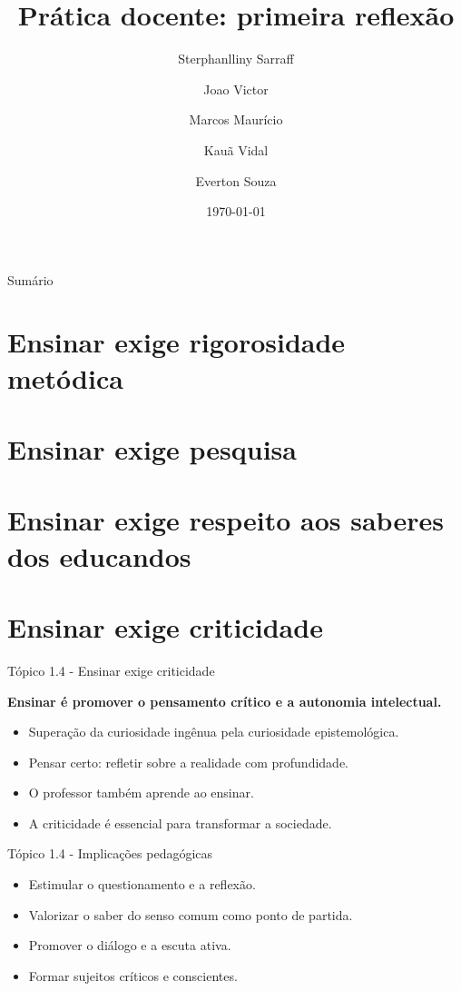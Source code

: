 \documentclass[12pt]{beamer}
\author[Sarraff \and Joao Victor \and ...]{%
Sterphanlliny Sarraff\inst{1} \and Joao Victor\inst{2} \and Marcos Maurício\inst{2} \\ \and Kauã Vidal\inst{2} \and Everton Souza\inst{2}}
\title[Prática docente: primeira reflexão]{Prática docente: primeira reflexão}
\institute[]{%
  \textsuperscript{1} Licenciatura em Física \\
  \textsuperscript{2} Licenciatura em Matemática 
}
\date{\today}
\begin{document}
\onehalfspacing 
\justifying 

\begin{frame}
    \titlepage
\end{frame}

\begin{frame}{Sumário}
    \tableofcontents
\end{frame}

\section{Ensinar exige rigorosidade metódica}
\section{Ensinar exige pesquisa}
\section{Ensinar exige respeito aos saberes dos educandos}
\section{Ensinar exige criticidade}

	\begin{frame}{Tópico 1.4 - Ensinar exige criticidade} 
		
		\textbf{Ensinar é promover o pensamento crítico e a autonomia intelectual.}
		
		\begin{itemize}
			\justifying
			\item Superação da curiosidade ingênua pela curiosidade epistemológica.
			\item Pensar certo: refletir sobre a realidade com profundidade.
			\item O professor também aprende ao ensinar.
			\item A criticidade é essencial para transformar a sociedade.
		\end{itemize}
		
	\end{frame}
	
	\begin{frame}{Tópico 1.4 - Implicações pedagógicas}
		
		\begin{itemize}
			\justifying
			\item Estimular o questionamento e a reflexão. \\
			\item Valorizar o saber do senso comum como ponto de partida. \\
			\item Promover o diálogo e a escuta ativa. \\
			\item Formar sujeitos críticos e conscientes. \\
		\end{itemize}
		
	\end{frame}
	
\end{document}
